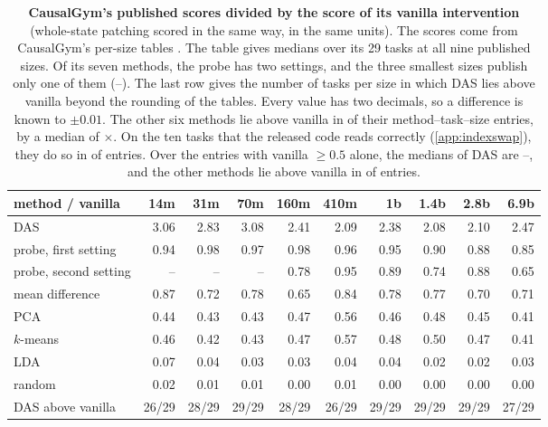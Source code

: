 \begin{table}[tbp]
  \caption{\textbf{CausalGym's published scores divided by the score of its vanilla intervention} (whole-state patching scored in
  the same way, in the same units). The scores come from CausalGym's per-size tables \citep[App.~E.2]{arora2024}.
  The table gives medians over its 29 tasks at all nine published sizes. Of its seven methods, the probe has two settings,
  and the three smallest sizes publish only one of them (--). The last row gives the number of tasks per size in which DAS
  lies above vanilla beyond the rounding of the tables. Every value has two decimals, so a difference is known to
  $\pm 0.01$. The other six methods lie above vanilla in \cgOtherAbove{} of their \cgOtherEntries{} method--task--size
  entries, by a median of \cgOtherExceedMed$\times$. On the ten tasks that the released code reads correctly
  (\cref{app:indexswap}), they do so in \cgOtherAboveAligned{} of \cgOtherEntriesAligned{} entries. Over the entries with
  vanilla $\ge 0.5$ alone, the medians of DAS are \cgFiltDasMedLo--\cgFiltDasMedHi, and the other methods lie above vanilla
  in \cgFiltOtherAbove{} of \cgFiltOtherEntries{} entries.}
  \label{tab:causalgym}
  \centering
  \footnotesize
  \begin{tabular}{@{}lrrrrrrrrr@{}}
    \toprule
    method / vanilla & 14m & 31m & 70m & 160m & 410m & 1b & 1.4b & 2.8b & 6.9b \\
    \midrule
    DAS & 3.06 & 2.83 & 3.08 & 2.41 & 2.09 & 2.38 & 2.08 & 2.10 & 2.47 \\
    probe, first setting & 0.94 & 0.98 & 0.97 & 0.98 & 0.96 & 0.95 & 0.90 & 0.88 & 0.85 \\
    probe, second setting & -- & -- & -- & 0.78 & 0.95 & 0.89 & 0.74 & 0.88 & 0.65 \\
    mean difference & 0.87 & 0.72 & 0.78 & 0.65 & 0.84 & 0.78 & 0.77 & 0.70 & 0.71 \\
    PCA & 0.44 & 0.43 & 0.43 & 0.47 & 0.56 & 0.46 & 0.48 & 0.45 & 0.41 \\
    $k$-means & 0.46 & 0.42 & 0.43 & 0.47 & 0.57 & 0.48 & 0.50 & 0.47 & 0.41 \\
    LDA & 0.07 & 0.04 & 0.03 & 0.03 & 0.04 & 0.04 & 0.02 & 0.02 & 0.03 \\
    random & 0.02 & 0.01 & 0.01 & 0.00 & 0.01 & 0.00 & 0.00 & 0.00 & 0.00 \\
    \midrule
    DAS above vanilla & 26/29 & 28/29 & 29/29 & 28/29 & 26/29 & 29/29 & 29/29 & 29/29 & 27/29 \\
    \bottomrule
  \end{tabular}
\end{table}
